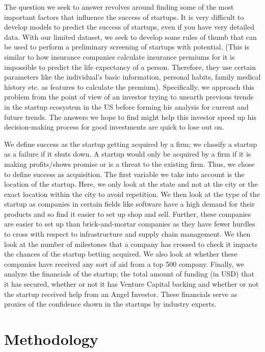 \documentclass[
]{article}
\begin{document}
The question we seek to answer revolves around finding some of the most
important factors that influence the success of startups. It is very
difficult to develop models to predict the success of startups, even if
you have very detailed data. With our limited dataset, we seek to
develop some rules of thumb that can be used to perform a preliminary
screening of startups with potential. (This is similar to how insurance
companies calculate insurance premiums for it is impossible to predict
the life expectancy of a person. Therefore, they use certain parameters
like the individual's basic information, personal habits, family medical
history etc. as features to calculate the premium). Specifically, we
approach this problem from the point of view of an investor trying to
unearth previous trends in the startup ecosystem in the US before
forming his analysis for current and future trends. The answers we hope
to find might help this investor speed up his decision-making process
for good investments are quick to lose out on.

We define success as the startup getting acquired by a firm; we classify
a startup as a failure if it shuts down. A startup would only be
acquired by a firm if it is making profits/shows promise or is a threat
to the existing firm. Thus, we chose to define success as acquisition.
The first variable we take into account is the location of the startup.
Here, we only look at the state and not at the city or the exact
location within the city to avoid repetition. We then look at the type
of the startup as companies in certain fields like software have a high
demand for their products and so find it easier to set up shop and sell.
Further, these companies are easier to set up than brick-and-mortar
companies as they have fewer hurdles to cross with respect to
infrastructure and supply chain management. We then look at the number
of milestones that a company has crossed to check it impacts the chances
of the startup betting acquired. We also look at whether these companies
have received any sort of aid from a top 500 company. Finally, we
analyze the financials of the startup; the total amount of funding (in
USD) that it has secured, whether or not it has Venture Capital backing
and whether or not the startup received help from an Angel Investor.
These financials serve as proxies of the confidence shown in the
startups by industry experts.

\hypertarget{methodology}{%
\section{Methodology}\label{methodology}}
\end{document}
